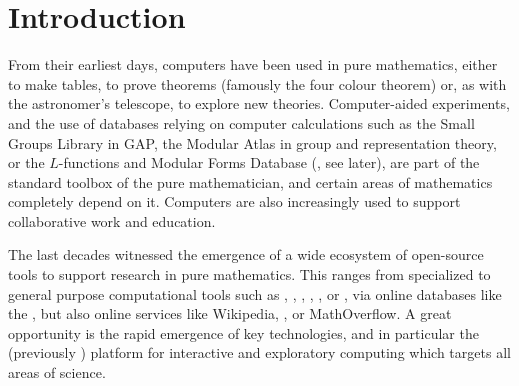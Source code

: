 \section{Introduction}

From their earliest days, computers have been used in pure mathematics, either to make
tables, to prove theorems (famously the four colour theorem) or, as with the astronomer's
telescope, to explore new theories. Computer-aided experiments, and the use of databases
relying on computer calculations such as the Small Groups Library in GAP, the Modular
Atlas in group and representation theory, or the $L$-functions and Modular Forms Database (\LMFDB, see later), are part of the standard
toolbox of the pure mathematician, and certain areas of mathematics completely depend on
it. Computers are also increasingly used to support collaborative work and education.

The last decades witnessed the emergence of a wide ecosystem of open-source tools to
support research in pure mathematics. This ranges from specialized to general purpose
computational tools such as \GAP, \PariGP, \Linbox, \MPIR, \Sage, or \Singular, via online
databases like the \LMFDB, but also online services like Wikipedia,
\Arxiv, or MathOverflow. A great opportunity is the rapid emergence of key technologies,
and in particular the \Jupyter (previously \IPython) platform for interactive and
exploratory computing which targets all areas of science.

